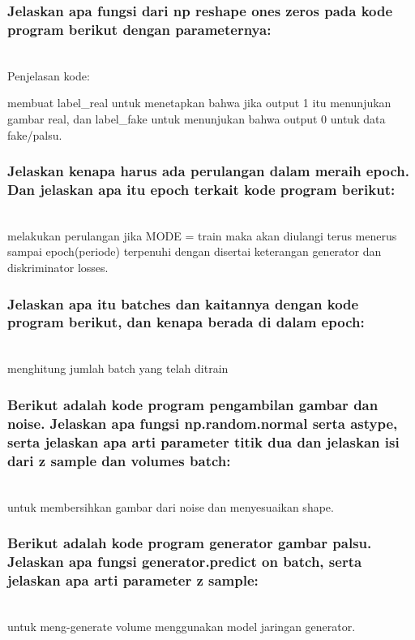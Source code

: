 \subsubsection{Jelaskan apa fungsi dari np reshape ones zeros pada kode program berikut dengan parameternya:}
\hfill\\
Penjelasan kode:

membuat label\_real untuk menetapkan bahwa jika output 1 itu menunjukan gambar real, dan label\_fake untuk menunjukan bahwa output 0 untuk data fake/palsu.

\subsubsection{Jelaskan kenapa harus ada perulangan dalam meraih epoch. Dan jelaskan apa itu epoch terkait kode program berikut:}
\hfill\\

melakukan perulangan jika MODE = train maka akan diulangi terus menerus sampai epoch(periode) terpenuhi dengan disertai keterangan generator dan diskriminator losses.

\subsubsection{Jelaskan apa itu batches dan kaitannya dengan kode program berikut, dan kenapa berada di dalam epoch:}
\hfill\\

menghitung jumlah batch yang telah ditrain

\subsubsection{Berikut adalah kode program pengambilan gambar dan noise. Jelaskan apa fungsi np.random.normal serta astype, serta jelaskan apa arti parameter titik dua dan jelaskan isi dari z sample dan volumes batch:}
\hfill\\

untuk membersihkan gambar dari noise dan menyesuaikan shape.

\subsubsection{Berikut adalah kode program generator gambar palsu. Jelaskan apa fungsi generator.predict on batch, serta jelaskan apa arti parameter z sample:}
\hfill\\

untuk meng-generate volume menggunakan model jaringan generator.


